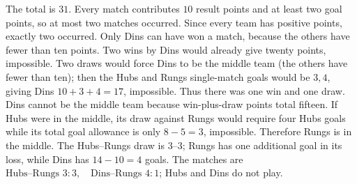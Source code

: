 The total is $31$. Every match contributes $10$ result points and at least two goal points, so at most two matches occurred. Since every team has positive points, exactly two occurred. Only Dins can have won a match, because the others have fewer than ten points. Two wins by Dins would already give twenty points, impossible. Two draws would force Dins to be the middle team (the others have fewer than ten); then the Hubs and Rungs single-match goals would be $3,4$, giving Dins $10+3+4=17$, impossible. Thus there was one win and one draw. Dins cannot be the middle team because win-plus-draw points total fifteen. If Hubs were in the middle, its draw against Rungs would require four Hubs goals while its total goal allowance is only $8-5=3$, impossible. Therefore Rungs is in the middle. The Hubs--Rungs draw is $3$--$3$; Rungs has one additional goal in its loss, while Dins has $14-10=4$ goals. The matches are $\boxed{\text{Hubs--Rungs }3\!:\!3,\quad\text{Dins--Rungs }4\!:\!1}$; Hubs and Dins do not play.
